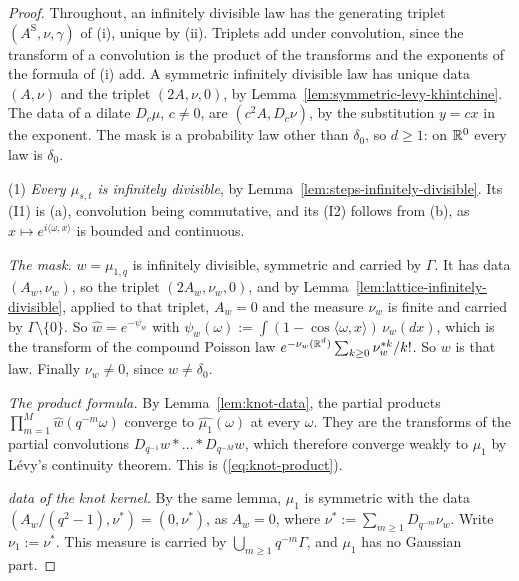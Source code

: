 \begin{proof}
\leanok
{}
Throughout, an infinitely divisible law has the generating triplet $(A^{\mathrm S}, \nu, \gamma)$ of
(i), unique by (ii). Triplets add under convolution, since the transform of
a convolution is the product of the transforms and the exponents of the formula of (i)
add. A symmetric infinitely divisible law has unique \Levy{} data $(A, \nu)$ and the triplet
$(2A, \nu, 0)$, by Lemma~\ref{lem:symmetric-levy-khintchine}. The data of a dilate $D_c\mu$, $c \ne 0$, are $(c^2A, D_c\nu)$, by the
substitution $y = cx$ in the exponent. The mask is a probability law other than $\delta_0$, so
$d \ge 1$: on $\mathbb{R}^0$ every law is $\delta_0$.

(1) \emph{Every $\mu_{s,t}$ is infinitely divisible}, by
Lemma~\ref{lem:steps-infinitely-divisible}. Its (I1) is (a), convolution being commutative, and its
(I2) follows from (b), as $x \mapsto e^{i\langle\omega, x\rangle}$ is bounded and continuous.

\emph{The mask.} $w = \mu_{1,q}$ is infinitely divisible, symmetric and carried by $\Gamma$. It has
data $(A_w, \nu_w)$, so the triplet $(2A_w, \nu_w, 0)$, and by
Lemma~\ref{lem:lattice-infinitely-divisible}, applied to that triplet, $A_w = 0$ and the \Levy{}
measure $\nu_w$ is finite and carried by $\Gamma \setminus \{0\}$. So
$\widehat{w} = e^{-\psi_w}$ with $\psi_w(\omega) := \int(1 - \cos\langle\omega, x\rangle)\,
\nu_w(dx)$, which is the transform of the compound Poisson law
$e^{-\nu_w(\mathbb{R}^d)}\sum_{k \ge 0}\nu_w^{*k}/k!$. So $w$ is that law. Finally $\nu_w \ne 0$, since
$w \ne \delta_0$.

\emph{The product formula.} By Lemma~\ref{lem:knot-data}, the partial products
$\prod_{m=1}^M\widehat{w}(q^{-m}\omega)$ converge to $\widehat{\mu_1}(\omega)$ at every $\omega$.
They are the transforms of the partial convolutions $D_{q^{-1}}w * \dots * D_{q^{-M}}w$, which
therefore converge weakly to $\mu_1$ by L\'evy's continuity theorem. This is
(\ref{eq:knot-product}).

\emph{\Levy{} data of the knot kernel.} By the same lemma, $\mu_1$ is symmetric with the data
$(A_w/(q^2 - 1), \nu^*) = (0, \nu^*)$, as $A_w = 0$, where $\nu^* := \sum_{m \ge 1}D_{q^{-m}}\nu_w$.
Write $\nu_1 := \nu^*$. This measure is carried by $\bigcup_{m \ge 1}q^{-m}\Gamma$, and $\mu_1$ has
no Gaussian part.


\end{proof}
